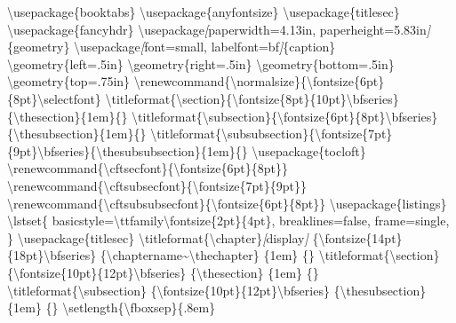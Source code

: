 \documentclass[
]{book}
\newenvironment{Shaded}{\begin{snugshade}}{\end{snugshade}}
\newcommand{\CommentTok}[1]{\textcolor[rgb]{0.56,0.35,0.01}{\textit{#1}}}
\newcommand{\NormalTok}[1]{#1}
\newcommand{\OtherTok}[1]{\textcolor[rgb]{0.56,0.35,0.01}{#1}}
\theoremstyle{definition}
\theoremstyle{definition}
\theoremstyle{definition}
\theoremstyle{definition}
\theoremstyle{remark}
\begin{document}
\begin{Shaded}
\begin{Highlighting}[]
\NormalTok{\textbackslash{}usepackage\{booktabs\}}
\NormalTok{\textbackslash{}usepackage\{anyfontsize\}}
\NormalTok{\textbackslash{}usepackage\{titlesec\}}
\NormalTok{\textbackslash{}usepackage\{fancyhdr\}}
\NormalTok{\textbackslash{}usepackage}\CommentTok{[}\OtherTok{paperwidth=4.13in, paperheight=5.83in}\CommentTok{]}\NormalTok{\{geometry\}}
\NormalTok{\textbackslash{}usepackage}\CommentTok{[}\OtherTok{font=small, labelfont=bf}\CommentTok{]}\NormalTok{\{caption\}}
\NormalTok{\textbackslash{}geometry\{left=.5in\}}
\NormalTok{\textbackslash{}geometry\{right=.5in\}}
\NormalTok{\textbackslash{}geometry\{bottom=.5in\}}
\NormalTok{\textbackslash{}geometry\{top=.75in\}}
\NormalTok{\textbackslash{}renewcommand\{\textbackslash{}normalsize\}\{\textbackslash{}fontsize\{6pt\}\{8pt\}\textbackslash{}selectfont\}}
\NormalTok{\textbackslash{}titleformat\{\textbackslash{}section\}\{\textbackslash{}fontsize\{8pt\}\{10pt\}\textbackslash{}bfseries\}\{\textbackslash{}thesection\}\{1em\}\{\}}
\NormalTok{\textbackslash{}titleformat\{\textbackslash{}subsection\}\{\textbackslash{}fontsize\{6pt\}\{8pt\}\textbackslash{}bfseries\}\{\textbackslash{}thesubsection\}\{1em\}\{\}}
\NormalTok{\textbackslash{}titleformat\{\textbackslash{}subsubsection\}\{\textbackslash{}fontsize\{7pt\}\{9pt\}\textbackslash{}bfseries\}\{\textbackslash{}thesubsubsection\}\{1em\}\{\}}
\NormalTok{\textbackslash{}usepackage\{tocloft\}}
\NormalTok{\textbackslash{}renewcommand\{\textbackslash{}cftsecfont\}\{\textbackslash{}fontsize\{6pt\}\{8pt\}\}}
\NormalTok{\textbackslash{}renewcommand\{\textbackslash{}cftsubsecfont\}\{\textbackslash{}fontsize\{7pt\}\{9pt\}\}}
\NormalTok{\textbackslash{}renewcommand\{\textbackslash{}cftsubsubsecfont\}\{\textbackslash{}fontsize\{6pt\}\{8pt\}\}}
\NormalTok{\textbackslash{}usepackage\{listings\}}
\NormalTok{\textbackslash{}lstset\{}
\NormalTok{  basicstyle=\textbackslash{}ttfamily\textbackslash{}fontsize\{2pt\}\{4pt\},}
\NormalTok{  breaklines=false,}
\NormalTok{  frame=single,}
\NormalTok{\}}
\NormalTok{\textbackslash{}usepackage\{titlesec\}}
\NormalTok{\textbackslash{}titleformat\{\textbackslash{}chapter\}}\CommentTok{[}\OtherTok{display}\CommentTok{]}
\NormalTok{  \{\textbackslash{}fontsize\{14pt\}\{18pt\}\textbackslash{}bfseries\} }
\NormalTok{  \{\textbackslash{}chaptername\textasciitilde{}\textbackslash{}thechapter\}       }
\NormalTok{  \{1em\}                            }
\NormalTok{  \{\}}
\NormalTok{\textbackslash{}titleformat\{\textbackslash{}section\}}
\NormalTok{  \{\textbackslash{}fontsize\{10pt\}\{12pt\}\textbackslash{}bfseries\} }
\NormalTok{  \{\textbackslash{}thesection\}                    }
\NormalTok{  \{1em\}                            }
\NormalTok{  \{\}}
\NormalTok{\textbackslash{}titleformat\{\textbackslash{}subsection\}}
\NormalTok{  \{\textbackslash{}fontsize\{10pt\}\{12pt\}\textbackslash{}bfseries\} }
\NormalTok{  \{\textbackslash{}thesubsection\}                 }
\NormalTok{  \{1em\}                            }
\NormalTok{  \{\}}
\NormalTok{\textbackslash{}setlength\{\textbackslash{}fboxsep\}\{.8em\}}
\end{Highlighting}
\end{Shaded}
\end{document}
